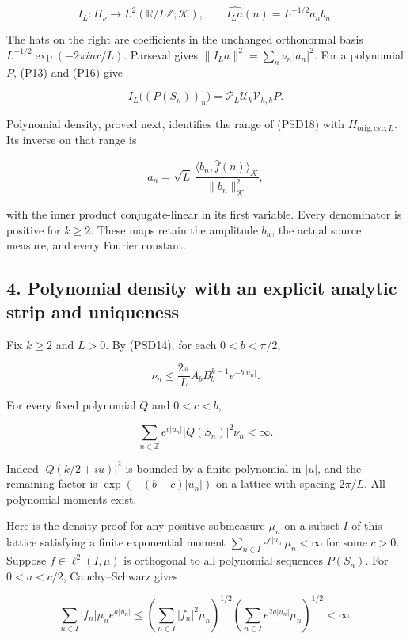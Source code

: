 \documentclass{article}
\begin{document}
\[
I_L:H_\nu\longrightarrow L^2(\mathbb R/L\mathbb Z;\mathcal K),
\qquad \widehat{I_La}(n)=L^{-1/2}a_nb_n.
\tag{PSD18}
\]

The hats on the right are coefficients in the unchanged orthonormal basis \(L^{-1/2}\exp(-2\pi i nr/L)\). Parseval gives \(\|I_La\|^2=\sum_n\nu_n|a_n|^2\). For a polynomial \(P\), (P13) and (P16) give

\[
I_L\bigl((P(S_n))_n\bigr)
=\mathcal P_L\mathcal U_k\mathcal V_{h,k}P.
\tag{PSD19}
\]

Polynomial density, proved next, identifies the range of (PSD18) with \(H_{\mathrm{orig,cyc},L}\). Its inverse on that range is

\[
a_n=\sqrt L\,
\frac{\langle b_n,\widehat f(n)\rangle_{\mathcal K}}{\|b_n\|_{\mathcal K}^2},
\tag{PSD20}
\]

with the inner product conjugate-linear in its first variable. Every denominator is positive for \(k\ge 2\). These maps retain the amplitude \(b_n\), the actual source measure, and every Fourier constant.

\subsection{4. Polynomial density with an explicit analytic strip and uniqueness}\label{polynomial-density-with-an-explicit-analytic-strip-and-uniqueness}

Fix \(k\ge 2\) and \(L>0\). By (PSD14), for each \(0<b<\pi/2\),

\[
\nu_n\le\frac{2\pi}{L}A_bB_b^{k-1}e^{-b|u_n|}.
\tag{PSD21}
\]

For every fixed polynomial \(Q\) and \(0<c<b\),

\[
\sum_{n\in\mathbb Z}e^{c|u_n|}|Q(S_n)|^2\nu_n<\infty.
\tag{PSD22}
\]

Indeed \(|Q(k/2+iu)|^2\) is bounded by a finite polynomial in \(|u|\), and the remaining factor is \(\exp(-(b-c)|u_n|)\) on a lattice with spacing \(2\pi/L\). All polynomial moments exist.

Here is the density proof for any positive submeasure \(\mu_n\) on a subset \(I\) of this lattice satisfying a finite exponential moment \(\sum_{n\in I}e^{c|u_n|}\mu_n<\infty\) for some \(c>0\). Suppose \(f\in\ell^2(I,\mu)\) is orthogonal to all polynomial sequences \(P(S_n)\). For \(0<a<c/2\), Cauchy--Schwarz gives

\[
\sum_{n\in I}|f_n|\mu_ne^{a|u_n|}
\le\left(\sum_{n\in I}|f_n|^2\mu_n\right)^{1/2}
\left(\sum_{n\in I}e^{2a|u_n|}\mu_n\right)^{1/2}<\infty.
\tag{PSD23}
\]
\end{document}
